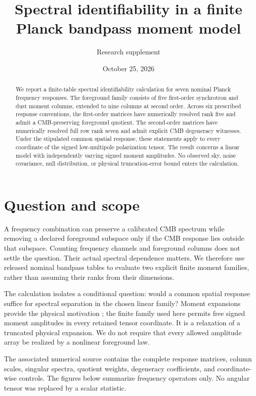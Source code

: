 \documentclass[aps,prd,preprint,nofootinbib,11pt]{revtex4-2}
\begin{document}
\title{Spectral identifiability in a finite Planck bandpass moment model}
\author{Research supplement}
\noaffiliation
\date{October 25, 2026}
\begin{abstract}
We report a finite-table spectral identifiability calculation for seven nominal Planck frequency responses. The foreground family consists of five first-order synchrotron and dust moment columns, extended to nine columns at second order. Across six prescribed response conventions, the first-order matrices have numerically resolved rank five and admit a CMB-preserving foreground quotient. The second-order matrices have numerically resolved full row rank seven and admit explicit CMB degeneracy witnesses. Under the stipulated common spatial response, these statements apply to every coordinate of the signed low-multipole polarization tensor. The result concerns a linear model with independently varying signed moment amplitudes. No observed sky, noise covariance, null distribution, or physical truncation-error bound enters the calculation.
\end{abstract}
\maketitle
\renewcommand{\baselinestretch}{1.1}\selectfont
\section{Question and scope}
A frequency combination can preserve a calibrated CMB spectrum while removing a declared foreground subspace only if the CMB response lies outside that subspace. Counting frequency channels and foreground columns does not settle the question. Their actual spectral dependence matters. We therefore use released nominal bandpass tables to evaluate two explicit finite moment families, rather than assuming their ranks from their dimensions.

The calculation isolates a conditional question: would a common spatial response suffice for spectral separation in the chosen linear family? Moment expansions provide the physical motivation \cite{cmilc}; the finite family used here permits free signed moment amplitudes in every retained tensor coordinate. It is a relaxation of a truncated physical expansion. We do not require that every allowed amplitude array be realized by a nonlinear foreground law.

The associated numerical source contains the complete response matrices, column scales, singular spectra, quotient weights, degeneracy coefficients, and coordinate-wise controls. The figures below summarize frequency operators only. No angular tensor was replaced by a scalar statistic.
\clearpage
\end{document}
